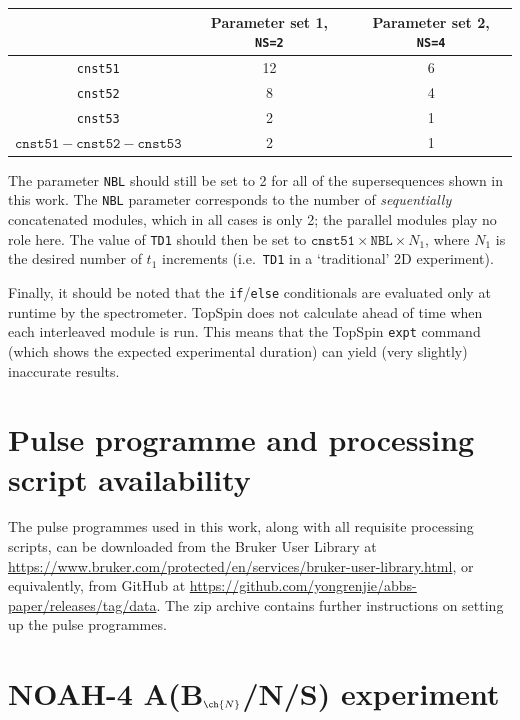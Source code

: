 \documentclass[a4paper,12pt]{article}
\newcommand{\abnns}{NOAH-4 A(B$_{\ch{N}}$/N/S)}
\begin{document}
\begin{refsection}
\begin{table}[H]
    \centering
    \begin{tabular}{ccc}
        \toprule
         & Parameter set 1, \texttt{NS=2} & Parameter set 2, \texttt{NS=4} \\
        \midrule
        \texttt{cnst51} & 12 & 6 \\
        \texttt{cnst52} & 8  & 4 \\
        \texttt{cnst53} & 2  & 1 \\
        $\texttt{cnst51} - \texttt{cnst52} - \texttt{cnst53}$ & 2  & 1 \\
        \bottomrule
    \end{tabular}
\end{table}

The parameter \texttt{NBL} should still be set to 2 for all of the supersequences shown in this work.
The \texttt{NBL} parameter corresponds to the number of \textit{sequentially} concatenated modules, which in all cases is only 2; the parallel modules play no role here.
The value of \texttt{TD1} should then be set to $\texttt{cnst51} \times \texttt{NBL} \times N_1$, where $N_1$ is the desired number of $t_1$ increments (i.e.\ \texttt{TD1} in a `traditional' 2D experiment).

Finally, it should be noted that the \texttt{if}/\texttt{else} conditionals are evaluated only at runtime by the spectrometer.
TopSpin does not calculate ahead of time when each interleaved module is run.
This means that the TopSpin \texttt{expt} command (which shows the expected experimental duration) can yield (very slightly) inaccurate results.

\section{Pulse programme and processing script availability}

The pulse programmes used in this work, along with all requisite processing scripts, can be downloaded from the Bruker User Library at \url{https://www.bruker.com/protected/en/services/bruker-user-library.html}, or equivalently, from GitHub at \url{https://github.com/yongrenjie/abbs-paper/releases/tag/data}.
The zip archive contains further instructions on setting up the pulse programmes.

\clearpage
\section{\texorpdfstring{\abnns{}}{NOAH-4 A(Bn/N/S)} experiment}


\end{refsection}
\end{document}
